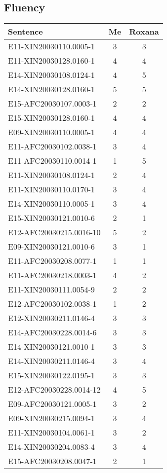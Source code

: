 \documentclass{article}
\begin{document}
\subsection{Fluency}

\begin{tabular}{|l|c|c|}
\hline
Sentence               & Me & Roxana \\
\hline \hline
E11-XIN20030110.0005-1 & 3 & 3 \\ \hline
E11-XIN20030128.0160-1 & 4 & 4 \\ \hline
E14-XIN20030108.0124-1 & 4 & 5 \\ \hline
E14-XIN20030128.0160-1 & 5 & 5 \\ \hline
E15-AFC20030107.0003-1 & 2 & 2 \\ \hline
E15-XIN20030128.0160-1 & 4 & 4 \\ \hline
E09-XIN20030110.0005-1 & 4 & 4 \\ \hline
E11-AFC20030102.0038-1 & 3 & 4 \\ \hline
E11-AFC20030110.0014-1 & 1 & 5 \\ \hline
E11-XIN20030108.0124-1 & 2 & 4 \\ \hline
E11-XIN20030110.0170-1 & 3 & 4 \\ \hline
E14-XIN20030110.0005-1 & 3 & 4 \\ \hline
E15-XIN20030121.0010-6 & 2 & 1 \\ \hline
E12-AFC20030215.0016-10 & 5 & 2 \\ \hline
E09-XIN20030121.0010-6 & 3 & 1 \\ \hline
E11-AFC20030208.0077-1 & 1 & 1 \\ \hline
E11-AFC20030218.0003-1 & 4 & 2 \\ \hline
E11-XIN20030111.0054-9 & 2 & 2 \\ \hline
E12-AFC20030102.0038-1 & 1 & 2 \\ \hline
E12-XIN20030211.0146-4 & 3 & 3 \\ \hline
E14-AFC20030228.0014-6 & 3 & 3 \\ \hline
E14-XIN20030121.0010-1 & 3 & 3 \\ \hline
E14-XIN20030211.0146-4 & 3 & 4 \\ \hline
E15-XIN20030122.0195-1 & 3 & 3 \\ \hline
E12-AFC20030228.0014-12 & 4 & 5 \\ \hline
E09-AFC20030121.0005-1 & 3 & 2 \\ \hline
E09-XIN20030215.0094-1 & 3 & 4 \\ \hline
E11-XIN20030104.0061-1 & 3 & 2 \\ \hline
E14-XIN20030204.0083-4 & 3 & 4 \\ \hline
E15-AFC20030208.0047-1 & 2 & 1 \\ 
\hline
\end{tabular}
\end{document}
